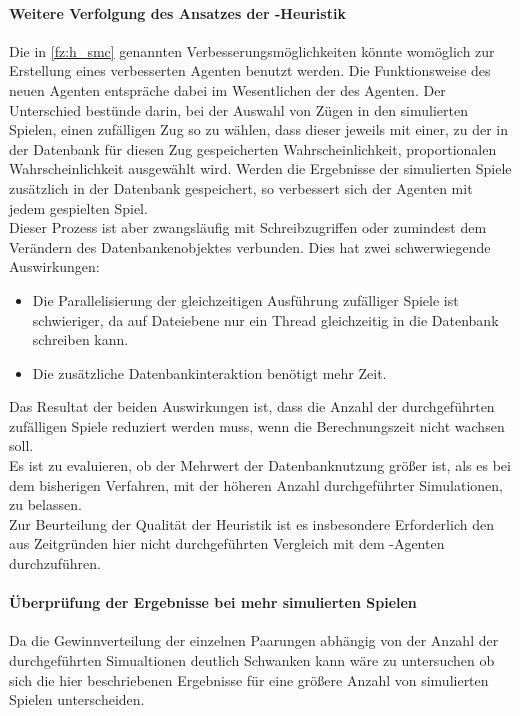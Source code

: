 \paragraph{Weitere Verfolgung des Ansatzes der -Heuristik}
Die in \ref{fz:h_smc} genannten Verbesserungsmöglichkeiten könnte womöglich zur Erstellung eines verbesserten Agenten benutzt werden. Die Funktionsweise des neuen Agenten entspräche dabei im Wesentlichen der des \mxZitat{\mc} Agenten. Der Unterschied bestünde darin, bei der Auswahl von Zügen in den simulierten Spielen, einen zufälligen Zug so zu wählen, dass dieser jeweils mit einer, zu der in der Datenbank für diesen Zug gespeicherten Wahrscheinlichkeit, proportionalen Wahrscheinlichkeit ausgewählt wird. Werden die Ergebnisse der simulierten Spiele zusätzlich in der Datenbank gespeichert, so verbessert sich der Agenten mit jedem gespielten Spiel.
\\Dieser Prozess ist aber zwangsläufig mit Schreibzugriffen oder zumindest dem Verändern des Datenbankenobjektes verbunden. Dies hat zwei schwerwiegende Auswirkungen:
\begin{itemize}
\item Die Parallelisierung der gleichzeitigen Ausführung zufälliger Spiele ist schwieriger, da auf Dateiebene nur ein Thread gleichzeitig in die Datenbank schreiben kann.
\item Die zusätzliche Datenbankinteraktion benötigt mehr Zeit.
\end{itemize}
Das Resultat der beiden Auswirkungen ist, dass die Anzahl der durchgeführten zufälligen Spiele reduziert werden muss, wenn die Berechnungszeit nicht wachsen soll.
\\Es ist zu evaluieren, ob der Mehrwert der Datenbanknutzung größer ist, als es bei dem bisherigen Verfahren, mit der höheren Anzahl durchgeführter Simulationen, zu belassen.
\\Zur Beurteilung der Qualität der  Heuristik ist es insbesondere Erforderlich den aus Zeitgründen hier nicht durchgeführten Vergleich mit dem \mc -Agenten durchzuführen.
\paragraph{Überprüfung der Ergebnisse bei mehr simulierten Spielen}
Da die Gewinnverteilung der einzelnen Paarungen abhängig von der Anzahl der durchgeführten Simualtionen deutlich Schwanken kann wäre zu untersuchen ob sich die hier beschriebenen Ergebnisse für eine größere Anzahl von simulierten Spielen unterscheiden.
